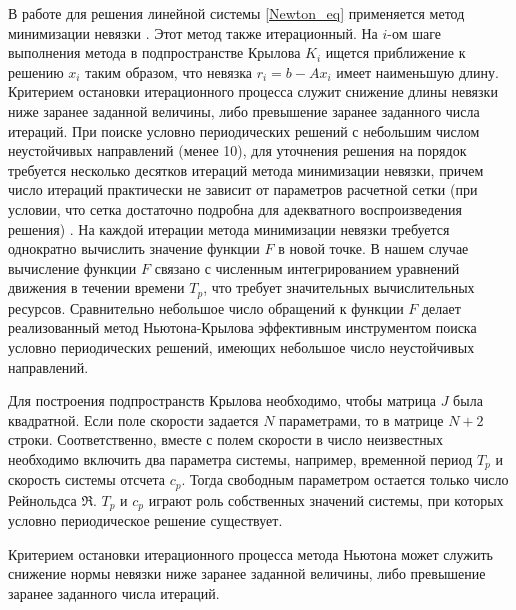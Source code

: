 В работе для решения линейной системы \eqref{Newton_eq} применяется метод минимизации невязки \cite{EEbook}. Этот метод также итерационный. На $i$-ом шаге выполнения метода в подпространстве Крылова $K_i$ ищется приближение к решению $x_i$ таким образом, что невязка $r_i = b - Ax_i$ имеет наименьшую длину. Критерием остановки итерационного процесса служит снижение длины невязки ниже заранее заданной величины, либо превышение заранее заданного числа итераций. При поиске условно периодических решений с небольшим числом неустойчивых направлений (менее 10), для уточнения решения на порядок требуется несколько десятков итераций метода минимизации невязки, причем число итераций  практически не зависит от параметров расчетной сетки (при условии, что сетка достаточно подробна для адекватного воспроизведения решения) \cite{Dijkstra2014}. На каждой итерации метода минимизации невязки требуется однократно вычислить значение функции $F$ в новой точке. В нашем случае вычисление функции $F$ связано с численным интегрированием уравнений движения в течении времени $T_p$, что требует значительных вычислительных ресурсов. Сравнительно небольшое число обращений к функции $F$ делает реализованный метод Ньютона-Крылова эффективным инструментом поиска условно периодических решений, имеющих небольшое число неустойчивых направлений.

Для построения подпространств Крылова необходимо, чтобы матрица $J$ была квадратной. Если поле скорости задается $N$ параметрами, то в матрице $N+2$ строки. Соответственно, вместе с полем скорости в число неизвестных необходимо включить два параметра системы, например, временной период $T_p$ и скорость системы отсчета $c_p$. Тогда свободным параметром остается только число Рейнольдса $\Re$. $T_p$ и $c_p$ играют роль собственных значений системы, при которых условно периодическое решение существует. 

Критерием остановки итерационного процесса метода Ньютона может служить снижение нормы невязки ниже заранее заданной величины, либо превышение заранее заданного числа итераций. 


